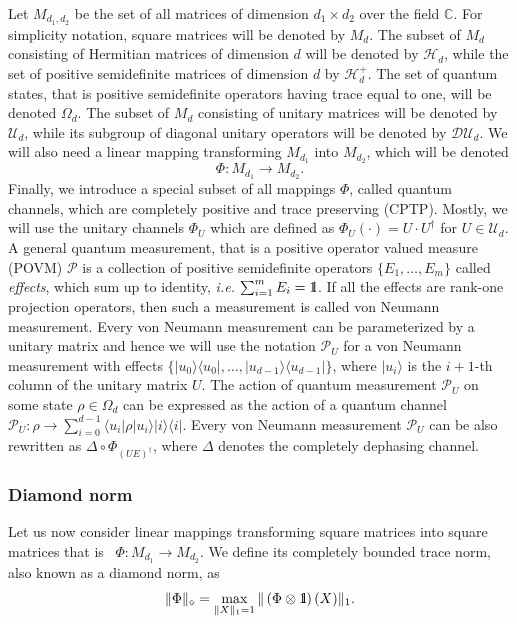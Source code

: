 \documentclass[preprint,12pt, a4paper]{elsarticle}
\newcommand{\ie}{{\emph{i.e.\/}}}
\newcommand{\ket}[1]{\ensuremath{|#1\rangle}}
\newcommand{\bra}[1]{\ensuremath{\langle#1|}}
\newcommand{\ketbra}[2]{\ensuremath{\ket{#1}\bra{#2}}}
\newcommand{\proj}[1]{\ensuremath{\ketbra{#1}{#1}}}
\newcommand{\1}{{\rm 1\hspace{-0.9mm}l}}
\newcommand{\DD}{\mathcal{D}}
\newcommand{\PP}{\mathcal{P}}
\newcommand{\UU}{\mathcal{U}}
\newcommand{\HH}{\mathcal{H}}
\begin{document}
Let $M_{d_1,d_2}$ be the set of all matrices of dimension $d_1 \times d_2$ over
the field $\mathbb{C}$. For  simplicity notation, square matrices will be 
denoted by
$M_d$.  The subset of $M_d$ consisting of Hermitian matrices of dimension $d$ 
will  be  denoted  by $\HH_d$,  while  the  set  of  positive semidefinite 
matrices of dimension $d$ by $\HH_d^+$. The set of quantum states, that is 
positive semidefinite operators having
trace equal to one, will be denoted $\Omega_d$.  The subset of $M_d$ consisting of 
unitary matrices will be denoted by
$\UU_d$, while its subgroup of diagonal unitary operators will be denoted by
$\DD \UU_d$.  We will also need a linear
mapping transforming $M_{d_1}$ into $M_{d_2}$, which will be denoted \begin{equation}
\Phi: M_{d_1 } \rightarrow M_{d_2}.
\end{equation} 
Finally, we introduce a special subset of all mappings $\Phi$, called quantum channels, which are completely positive
and trace preserving (CPTP).
Mostly, we will use the unitary channels
$\Phi_{U}$ which are defined as $\Phi_U(\cdot) = U \cdot U^\dagger$ for  $U \in 
\UU_d$. A general quantum
measurement, that is a positive operator valued measure (POVM) $\PP$ is a
collection of positive semidefinite operators $\{E_1, \ldots, E_m \}$ called
\emph{effects}, which sum up to identity, \ie $ \, \, \sum_{i=1}^m E_i = \1$. If
all the effects are rank-one projection operators, then such a measurement is
called von Neumann measurement. Every von Neumann measurement can be
parameterized by a unitary matrix and hence we will use the notation $\PP_{U}$
for a von Neumann measurement with effects $\{\proj{u_0}, \ldots, \proj{u_{d-1}}\}$,
where $\ket{u_i}$ is the $i+1$-th column of the unitary matrix $U$. The action of
quantum measurement $\PP_{U}$ on some state $\rho \in \Omega_d$ can be
expressed as the action of a quantum channel
$
\PP_{U} : \rho \rightarrow \sum_{i=0}^{d-1} \bra{u_i} \rho \ket{u_i} \proj{i}.
$ Every von Neumann measurement  $\PP_{U}$ can be also rewritten as $\Delta 
\circ \Phi_{(UE)^\dagger}$, where $\Delta$ denotes the completely dephasing 
channel.  








\subsubsection{Diamond norm}
Let us now consider linear mappings transforming  square matrices into square 
matrices 
that is \ $\Phi: M_{d_1} \to M_{d_2}$. 
 We define its completely bounded trace
norm, also known as a diamond norm, as
\begin{equation}
\|\Phi\|_\diamond = \max_{\|X\|_1=1} \| \left(\Phi \otimes \1\right) (X) \|_1.
\end{equation}
\end{document}
